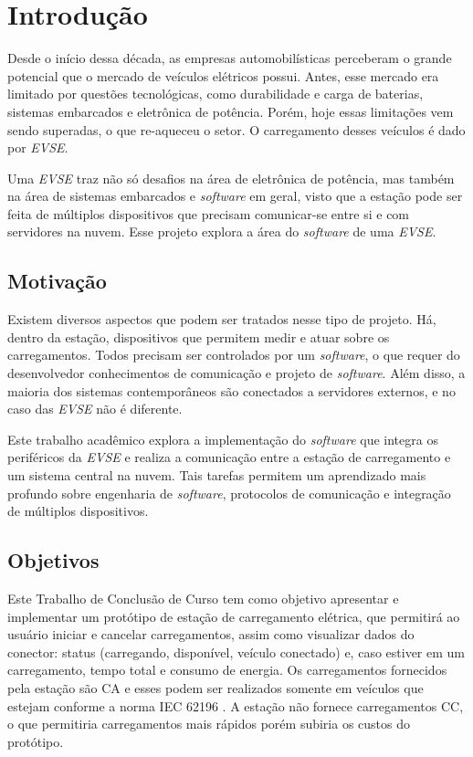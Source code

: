 \chapter{Introdução}
\label{stateofart:intro}

  Desde o início dessa década, as empresas automobilísticas perceberam o grande potencial que o mercado de veículos elétricos possui. Antes, esse mercado era limitado por questões tecnológicas, como durabilidade e carga de baterias,  sistemas embarcados e eletrônica de potência. Porém, hoje essas limitações vem sendo superadas, o que re-aqueceu o setor. O carregamento desses veículos é dado por \textit{\ac{EVSE}}.

  Uma \textit{\ac{EVSE}} traz não só desafios na área de eletrônica de potência, mas também na área de sistemas embarcados e \textit{software} em geral, visto que a estação pode ser feita de múltiplos dispositivos que precisam comunicar-se entre si e com servidores na nuvem. Esse projeto explora a área do \textit{software} de uma \textit{\ac{EVSE}}.

  \section{Motivação}
  \label{stateofart:intro:motivation}

    Existem diversos aspectos que podem ser tratados nesse tipo de projeto. Há, dentro da estação, dispositivos que permitem medir e atuar sobre os carregamentos. Todos precisam ser controlados por um \textit{software}, o que requer do desenvolvedor conhecimentos de comunicação e projeto de \textit{software}. Além disso, a maioria dos sistemas contemporâneos são conectados a servidores externos, e no caso das \textit{\ac{EVSE}} não é diferente.

    Este trabalho acadêmico explora a implementação do \textit{software} que integra os periféricos da \textit{\ac{EVSE}} e realiza a comunicação entre a estação de carregamento e um sistema central na nuvem. Tais tarefas permitem um aprendizado mais profundo sobre engenharia de \textit{software}, protocolos de comunicação e integração de múltiplos dispositivos.

  \section{Objetivos}
  \label{stateofart:intro:objectives}

    Este Trabalho de Conclusão de Curso tem como objetivo apresentar e implementar um protótipo de estação de carregamento elétrica, que permitirá ao usuário iniciar e cancelar carregamentos, assim como visualizar dados do conector: status (carregando, disponível, veículo conectado) e, caso estiver em um carregamento, tempo total e consumo de energia. Os carregamentos fornecidos pela estação são \ac{CA} e esses podem ser realizados somente em veículos que estejam conforme a norma IEC 62196 \cite{iec-62196}. A estação não fornece carregamentos \ac{CC}, o que permitiria carregamentos mais rápidos porém subiria os custos do protótipo.

